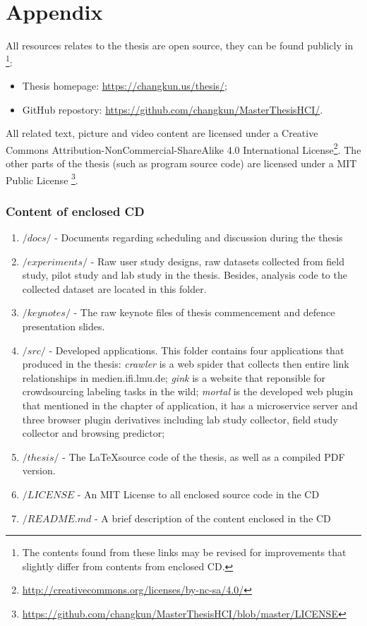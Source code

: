 \part*{Appendix}
\appendix
{}
\fancyhead[LE,RO,LO,RE]{} %

All resources relates to the thesis are open source, 
they can be found publicly in \footnote{The contents found from these links may be revised 
for improvements that slightly differ from contents from enclosed CD.}:

\begin{itemize}
    \item Thesis homepage: \url{https://changkun.us/thesis/};
    \item GitHub repostory: \url{https://github.com/changkun/MasterThesisHCI/}.
\end{itemize}

All related text, picture and video content are licensed under a 
Creative Commons Attribution-NonCommercial-ShareAlike 4.0 International 
License\footnote{\url{http://creativecommons.org/licenses/by-nc-sa/4.0/}}.
The other parts of the thesis (such as program source code) are licensed 
under a MIT Public License
\footnote{\url{https://github.com/changkun/MasterThesisHCI/blob/master/LICENSE}}.

\section{Content of enclosed CD}
\label{appendix:a}

\begin{enumerate}
    \item $/docs/$ - Documents regarding scheduling and discussion during the thesis
    \item $/experiments/$ - Raw user study designs, raw datasets collected from field study, pilot study and lab study in the thesis. Besides, analysis code to the collected dataset are located in this folder.
    \item $/keynotes/$ - The raw keynote files of thesis commencement and 
                        defence presentation slides.
    \item $/src/$ - Developed applications. This folder contains four applications that produced in the thesis: \emph{crawler} is a web spider that collects then entire link
    relationships in medien.ifi.lmu.de; \emph{gink} is a website that reponsible for 
    crowdsourcing labeling tasks in the wild; \emph{mortal} is the developed web plugin 
    that mentioned in the chapter of application, it has a microservice server and three browser plugin derivatives including lab study collector, field study collector and browsing predictor;
    \item $/thesis/$ - The \LaTeX source code of the thesis, as well as a compiled PDF version.
    \item $/LICENSE$ - An MIT License to all enclosed source code in the CD
    \item $/README.md$ - A brief description of the content enclosed in the CD
\end{enumerate}

